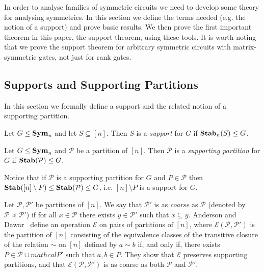 \documentclass[../paper.tex]{subfiles}
\begin{document}
In order to analyse families of symmetric circuits we need to develop some
theory for analysing symmetries. In this section we define the terms needed
(e.g. the notion of a support) and prove basic results. We then prove the first
important theorem in this paper, the support theorem, using these tools. It is
worth noting that we prove the support theorem for arbitrary symmetric circuits
with matrix-symmetric gates, not just for rank gates.    

\subsection{Supports and Supporting Partitions}
In this section we formally define a support and the related notion of a
supporting partition.

\begin{definition}
  Let $G \leq \text{\textbf{Sym}}_n$ and let $S \subseteq [n]$. Then $S$ is a \emph{support}
  for $G$ if $\text{\textbf{Stab}}_n(S) \leq G$. 
\end{definition}

\begin{definition}
  Let $G \leq \text{\textbf{Sym}}_n$ and $\mathcal{P}$ be a partition of $[n]$. Then
  $\mathcal{P}$ is a \emph{supporting partition} for $G$ if $\text{\textbf{Stab}}(\mathcal{P})
  \leq G$.
\end{definition}

Notice that if $\mathcal{P}$ is a supporting partition for $G$ and $P \in
\mathcal{P}$ then $\text{\textbf{Stab}}([n] \setminus P) \leq \text{\textbf{Stab}}(\mathcal{P}) \leq G$, i.e.
$[n] \setminus P$ is a support for $G$.

Let $\mathcal{P}, \mathcal{P}'$ be partitions of $[n]$. We say that
$\mathcal{P}'$ is as \emph{coarse} as $\mathcal{P}$ (denoted by $\mathcal{P}
\preceq \mathcal{P}'$) if for all $x \in \mathcal{P}$ there exists $y \in
\mathcal{P}'$ such that $x \subseteq y$. Anderson and Dawar~\cite{AndersonD17}
define an operation $\mathcal{E}$ on pairs of partitions of $[n]$, where
$\mathcal{E} (\mathcal{P}, \mathcal{P}')$ is the partition of $[n]$ consisting
of the equivalence classes of the transitive closure of the relation $\sim$ on
$[n]$ defined by $a \sim b$ if, and only if, there exists $P \in \mathcal{P}
\cup mathcal{P}'$ such that $a,b \in P$. They show that $\mathcal{E}$ preserves
supporting partitions, and that $\mathcal{E}(\mathcal{P}, \mathcal{P}')$ is as
coarse as both $\mathcal{P}$ and $\mathcal{P}'$.
\end{document}
